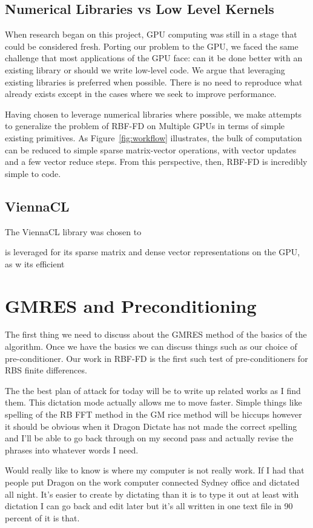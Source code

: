 \documentclass[11pt]{report}
\begin{document}
\section{Numerical Libraries vs Low Level Kernels}

When research began on this project, GPU computing was still in a stage that could be considered fresh. Porting our problem to the GPU, we faced the same challenge that most applications of the GPU face: can it be done better with an existing library or should we write low-level code. We argue that leveraging existing libraries is preferred when possible. There is no need to reproduce what already exists except in the cases where we seek to improve performance. 

Having chosen to leverage numerical libraries where possible, we make attempts to generalize the problem of RBF-FD on Multiple GPUs in terms of simple existing primitives. As Figure~\ref{fig:workflow} illustrates, the bulk of computation can be reduced to simple sparse matrix-vector operations, with vector updates and a few vector reduce steps. From this perspective, then, RBF-FD is incredibly simple to code. 

\section{ViennaCL}

The ViennaCL library was chosen to 

is leveraged for its sparse matrix and dense vector representations on the GPU, as w its efficient 




\chapter{GMRES and Preconditioning}
The first thing we need to discuss about the GMRES method of the basics of the algorithm. Once we have the basics we can discuss things such as our choice of pre-conditioner. Our work in RBF-FD is the first such test of pre-conditioners for RBS finite differences.

The the best plan of attack for today will be to write up related works as I find them. This dictation mode actually allows me to move faster. Simple things like spelling of the RB FFT method in the GM rice method will be hiccups however it should be obvious when it Dragon Dictate has not made the correct spelling and I'll be able to go back through on my second pass and actually revise the phrases into whatever words I need.

Would really like to know is where my computer is not really work. If I had that people put Dragon on the work computer connected Sydney office and dictated all night. It's easier to create by dictating than it is to type it out at least with dictation I can go back and edit later but it's all written in one text file in 90 percent of it is that. 
\end{document}
